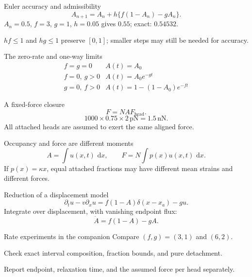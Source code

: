 \documentclass[aspectratio=169,11pt]{beamer}
\providecommand{\dd}{\,\mathrm{d}}\providecommand{\R}{\mathbb{R}}
\newcommand{\notestarget}{notes.pdf}\newcommand{\noteslabel}{Notes}
\begin{document}
\renewcommand{\notestarget}{notes.pdf\#note-rate-changes-and-numerical-preservation-of-fractions}
\begin{frame}[t,fragile,label=slide-euler-accuracy-and-admissibility]{Euler accuracy and admissibility}
\[A_{n+1}=A_n+h\{f(1-A_n)-gA_n\}.\]\pause{} $A_n=0.5$, $f=3$, $g=1$, $h=0.05$ gives $0.55$; exact: $0.54532$.\par\medskip $hf\leq1$ and $hg\leq1$ preserve $[0,1]$; smaller steps may still be needed for accuracy.
\end{frame}
\renewcommand{\notestarget}{notes.pdf\#note-rate-changes-and-numerical-preservation-of-fractions}
\begin{frame}[t,fragile,label=slide-the-zero-rate-and-one-way-limits]{The zero-rate and one-way limits}
\[\begin{array}{c|c}f=g=0&A(t)=A_0\\f=0,\ g>0&A(t)=A_0e^{-gt}\\g=0,\ f>0&A(t)=1-(1-A_0)e^{-ft}\end{array}\]
\end{frame}
\renewcommand{\notestarget}{notes.pdf\#note-mechanical-force-requires-a-distribution-or-a-closure}
\begin{frame}[t,fragile,label=slide-a-fixed-force-closure]{A fixed-force closure}
\[F=NAF_{\mathrm{head}}.\]\pause{}\[1000\times0.75\times2\,\mathrm{pN}=1.5\,\mathrm{nN}.\] All attached heads are assumed to exert the same aligned force.
\end{frame}
\renewcommand{\notestarget}{notes.pdf\#note-mechanical-force-requires-a-distribution-or-a-closure}
\begin{frame}[t,fragile,label=slide-occupancy-and-force-are-different-moments]{Occupancy and force are different moments}
\[A=\int u(x,t)\,\dd x,\qquad F=N\int p(x)u(x,t)\,\dd x.\]\pause{} If $p(x)=\kappa x$, equal attached fractions may have different mean strains and different forces.
\end{frame}
\renewcommand{\notestarget}{notes.pdf\#note-mechanical-force-requires-a-distribution-or-a-closure}
\begin{frame}[t,fragile,label=slide-reduction-of-a-displacement-model]{Reduction of a displacement model}
\[\partial_tu-v\partial_xu=f(1-A)\delta(x-x_a)-gu.\]\pause{} Integrate over displacement, with vanishing endpoint flux:\[\dot A=f(1-A)-gA.\]
\end{frame}
\renewcommand{\notestarget}{notes.pdf\#note-computation-and-the-scope-of-a-force-measurement}
\begin{frame}[t,fragile,label=slide-rate-experiments-in-the-companion]{Rate experiments in the companion}
Compare $(f,g)=(3,1)$ and $(6,2)$.\par\medskip Check exact interval composition, fraction bounds, and pure detachment.\pause{}\par\medskip Report endpoint, relaxation time, and the assumed force per head separately.
\end{frame}
\end{document}
